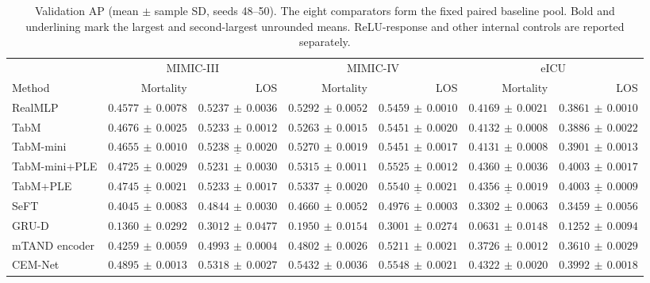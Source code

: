 \begin{table}[tp]
\centering\footnotesize
\setlength{\tabcolsep}{3pt}
\caption{Validation AP (mean $\pm$ sample SD, seeds 48--50). The eight comparators form the fixed paired baseline pool. Bold and underlining mark the largest and second-largest unrounded means. ReLU-response and other internal controls are reported separately.}
\label{tab:development}
\begin{tabular}{lrrrrrr}
\toprule
& \multicolumn{2}{c}{MIMIC-III} & \multicolumn{2}{c}{MIMIC-IV} & \multicolumn{2}{c}{eICU} \\
\cmidrule(lr){2-3}\cmidrule(lr){4-5}\cmidrule(lr){6-7}
Method & Mortality & LOS & Mortality & LOS & Mortality & LOS \\
\midrule
RealMLP & $0.4577\,\pm\,0.0078$ & $0.5237\,\pm\,0.0036$ & $0.5292\,\pm\,0.0052$ & $0.5459\,\pm\,0.0010$ & $0.4169\,\pm\,0.0021$ & $0.3861\,\pm\,0.0010$ \\
TabM & $0.4676\,\pm\,0.0025$ & $0.5233\,\pm\,0.0012$ & $0.5263\,\pm\,0.0015$ & $0.5451\,\pm\,0.0020$ & $0.4132\,\pm\,0.0008$ & $0.3886\,\pm\,0.0022$ \\
TabM-mini & $0.4655\,\pm\,0.0010$ & $\underline{0.5238\,\pm\,0.0020}$ & $0.5270\,\pm\,0.0019$ & $0.5451\,\pm\,0.0017$ & $0.4131\,\pm\,0.0008$ & $0.3901\,\pm\,0.0013$ \\
TabM-mini+PLE & $0.4725\,\pm\,0.0029$ & $0.5231\,\pm\,0.0030$ & $0.5315\,\pm\,0.0011$ & $0.5525\,\pm\,0.0012$ & $\mathbf{0.4360\,\pm\,0.0036}$ & $\mathbf{0.4003\,\pm\,0.0017}$ \\
TabM+PLE & $\underline{0.4745\,\pm\,0.0021}$ & $0.5233\,\pm\,0.0017$ & $\underline{0.5337\,\pm\,0.0020}$ & $\underline{0.5540\,\pm\,0.0021}$ & $\underline{0.4356\,\pm\,0.0019}$ & $\underline{0.4003\,\pm\,0.0009}$ \\
SeFT & $0.4045\,\pm\,0.0083$ & $0.4844\,\pm\,0.0030$ & $0.4660\,\pm\,0.0052$ & $0.4976\,\pm\,0.0003$ & $0.3302\,\pm\,0.0063$ & $0.3459\,\pm\,0.0056$ \\
GRU-D & $0.1360\,\pm\,0.0292$ & $0.3012\,\pm\,0.0477$ & $0.1950\,\pm\,0.0154$ & $0.3001\,\pm\,0.0274$ & $0.0631\,\pm\,0.0148$ & $0.1252\,\pm\,0.0094$ \\
mTAND encoder & $0.4259\,\pm\,0.0059$ & $0.4993\,\pm\,0.0004$ & $0.4802\,\pm\,0.0026$ & $0.5211\,\pm\,0.0021$ & $0.3726\,\pm\,0.0012$ & $0.3610\,\pm\,0.0029$ \\
CEM-Net & $\mathbf{0.4895\,\pm\,0.0013}$ & $\mathbf{0.5318\,\pm\,0.0027}$ & $\mathbf{0.5432\,\pm\,0.0036}$ & $\mathbf{0.5548\,\pm\,0.0021}$ & $0.4322\,\pm\,0.0020$ & $0.3992\,\pm\,0.0018$ \\
\bottomrule
\end{tabular}
\end{table}
